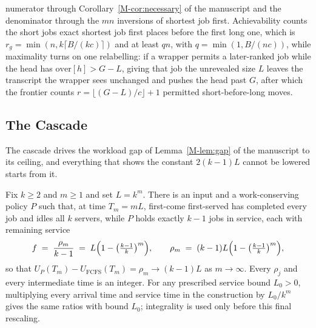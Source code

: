 \documentclass[mathematics,supfile,submit,moreauthors]{Definitions/mdpi}
\begin{document}
numerator through Corollary~\ref*{M-cor:necessary} of the manuscript and the denominator through the $mn$
inversions of shortest job first. Achievability counts the short jobs exact shortest job
first places before the first long one, which is
$r_g = \min(n, k\lceil B/(kc)\rceil)$ and at least $qn$, with $q = \min(1, B/(nc))$, while
maximality turns on
one relabelling: if a wrapper permits a later-ranked job while the head has
$\mathrm{over}[h] > G - L$, giving that job the unrevealed size $L$ leaves the
transcript the wrapper sees unchanged and pushes the head past $G$, after which the
frontier counts $r = \lfloor (G-L)/c \rfloor + 1$ permitted short-before-long
moves.

\subsection{The Cascade}
\label{sec:supp_cascade}

The cascade drives the workload gap of Lemma~\ref*{M-lem:gap} of the manuscript to its ceiling, and
everything that shows the constant $2(k-1)L$ cannot be lowered starts from it.

\begin{lemma}
\label{lem:cascade}
Fix $k \ge 2$ and $m \ge 1$ and set $L = k^m$. There is an input and a
work-conserving policy $P$ such that, at time $T_m = mL$, first-come first-served
has completed every job and idles all $k$ servers, while $P$ holds exactly $k-1$
jobs in service, each with remaining service
\[
  f \;=\; \frac{\rho_m}{k-1} \;=\; L\Bigl(1 - \bigl(\tfrac{k-1}{k}\bigr)^{m}\Bigr) ,
  \qquad
  \rho_m \;=\; (k-1)L\Bigl(1 - \bigl(\tfrac{k-1}{k}\bigr)^{m}\Bigr) ,
\]
so that $U_P(T_m) - U_{\mathrm{FCFS}}(T_m) = \rho_m \to (k-1)L$ as
$m \to \infty$. Every $\rho_j$ and every intermediate time is an integer.
For any prescribed service bound $L_0>0$, multiplying every arrival time and
service time in the construction by $L_0/k^m$ gives the same ratios with bound
$L_0$; integrality is used only before this final rescaling.
\end{lemma}
\end{document}
